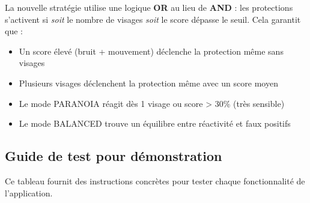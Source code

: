 \documentclass[11pt,a4paper]{article}
\begin{document}
La nouvelle stratégie utilise une logique \textbf{OR} au lieu de \textbf{AND} : les protections s'activent si \textit{soit} le nombre de visages \textit{soit} le score dépasse le seuil. Cela garantit que :
\begin{itemize}
    \item Un score élevé (bruit + mouvement) déclenche la protection même sans visages
    \item Plusieurs visages déclenchent la protection même avec un score moyen
    \item Le mode PARANOIA réagit dès 1 visage ou score > 30\% (très sensible)
    \item Le mode BALANCED trouve un équilibre entre réactivité et faux positifs
\end{itemize}

\subsection{Guide de test pour démonstration}

Ce tableau fournit des instructions concrètes pour tester chaque fonctionnalité de l'application.
\end{document}
